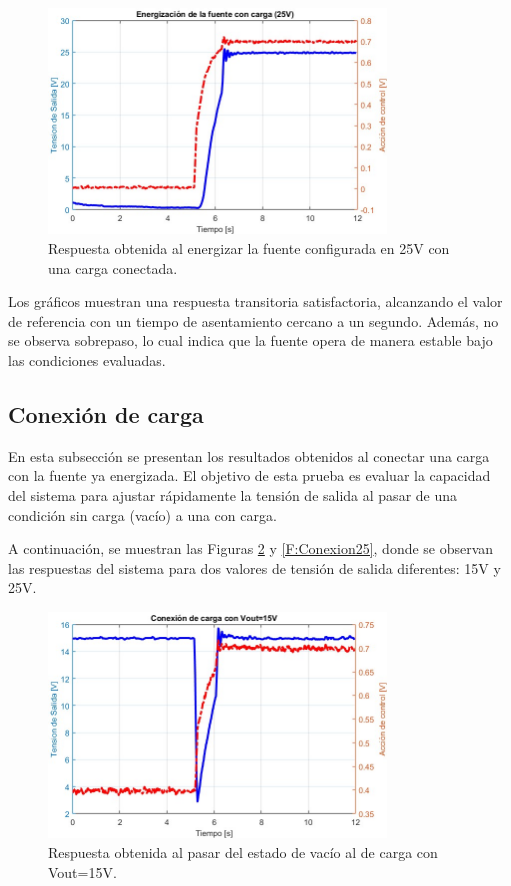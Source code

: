\begin{figure}[htbp]
    \centering
    \includegraphics[width=0.8\textwidth]{./imagenes/Energizacion25.jpg}
    \caption{Respuesta obtenida al energizar la fuente configurada en 25V con una carga conectada.}
    \label{F:Energizacion25}
\end{figure}\par 
Los gráficos muestran una respuesta transitoria satisfactoria, alcanzando el valor de referencia con un tiempo de asentamiento cercano a un segundo. Además, no se observa sobrepaso, lo cual indica que la fuente opera de manera estable bajo las condiciones evaluadas.\par 

\subsection{Conexión de carga}
En esta subsección se presentan los resultados obtenidos al conectar una carga con la fuente ya energizada.  El objetivo de esta prueba es evaluar la capacidad del sistema para ajustar rápidamente la tensión de salida al pasar de una condición sin carga (vacío) a una con carga. \par
A continuación, se muestran las Figuras \ref{F:Conexion15} y \ref{F:Conexion25}, donde se observan las respuestas del sistema para dos valores de tensión de salida diferentes: 15V y 25V.\par 

\begin{figure}[htbp]
    \centering
    \includegraphics[width=0.8\textwidth]{./imagenes/Conexion2.jpg}
    \caption{Respuesta obtenida al pasar del estado de vacío al de carga con Vout=15V.}
    \label{F:Conexion15}
\end{figure}\par 

